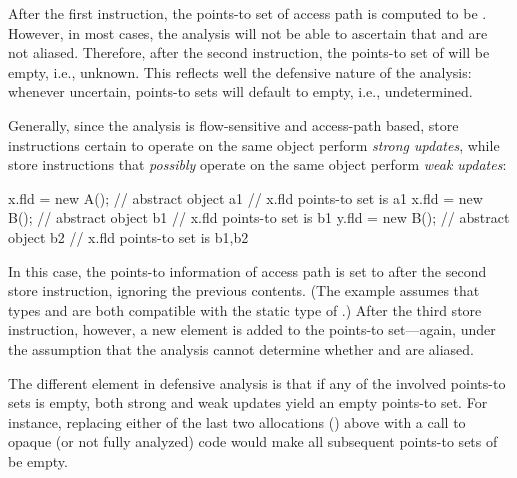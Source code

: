 After the first instruction, the points-to set of access path
 is computed to be . However, in most cases, the
analysis will not be able to ascertain that  and  are not
aliased.
Therefore, after the second instruction, the points-to set of
 will be empty, i.e., unknown. This reflects well the
defensive nature of the analysis: whenever uncertain, points-to sets
will default to empty, i.e., undetermined.

Generally, since the analysis is flow-sensitive and access-path based, store instructions
certain to operate on the same object perform \emph{strong updates},
while store instructions that \emph{possibly} operate on the same
object perform \emph{weak updates}:

\vspace{-3mm}\begin{minipage}[l]{5.1in}
\begin{javacode}
x.fld = new A();  // abstract object a1
 // x.fld points-to set is {a1}
x.fld = new B();  // abstract object b1
 // x.fld points-to set is {b1} 
y.fld = new B();  // abstract object b2
 // x.fld points-to set is {b1,b2}
\end{javacode}
\end{minipage}

In this case, the points-to information of access path  is
set to  after the second store instruction, ignoring the
previous contents.  (The example assumes that types  and 
are both compatible with the static type of .) After the
third store instruction, however, a new element is added to the
points-to set---again, under the assumption that the analysis cannot
determine whether  and  are aliased.

The different element in defensive analysis is that if any of the
involved points-to sets is empty, both strong and weak updates yield
an empty points-to set. For instance, replacing either of the last two
allocations () above with a call to opaque (or not fully
analyzed) code would make
all subsequent points-to sets of  be empty.


